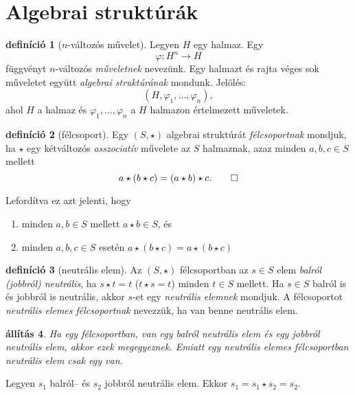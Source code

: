 \documentclass[9pt, a4paper, showtrims]{memoir}
\makeatletter
\renewenvironment{proof}[1][\proofname]
    {\par\pushQED{\qed}%
    \normalfont \topsep6\p@\@plus6\p@\relax
    \trivlist
    \item[\hskip\labelsep
        \itshape
    #1\@addpunct{:}]\ignorespaces}
    {\popQED\endtrivlist\@endpefalse}
\theoremstyle{plain}
\newtheorem{proposition}{állítás}[chapter]
\theoremstyle{remark}
\theoremstyle{definition}
\newtheorem{definition}[proposition]{definíció}
\makeatother
\begin{document}
\section{Algebrai struktúrák}
\begin{definition}[$n$-változós művelet]
    Legyen $H$ egy halmaz. Egy 
    \[
        \varphi\colon H^n\to H
    \]
    függvényt $n$-változós \emph{műveletnek} nevezünk.
    Egy halmazt és rajta véges sok műveletet együtt \emph{algebrai struktúrának} mondunk.
    Jelölés: 
    $$\left(H,\varphi_1,\dots,\varphi_n  \right),$$ 
    ahol $H$ a halmaz és
    $\varphi_1,\dots,\varphi_n$ a $H$ halmazon értelmezett műveletek.
\end{definition}
\begin{definition}[félcsoport]
    Egy $\left( S,\star \right)$ algebrai struktúrát \emph{félcsoportnak} mondjuk,
    ha $\star$ egy kétváltozós \emph{asszociatív}
    művelete az $S$ halmaznak,
    azaz minden $a,b,c\in S$ mellett
    \[
        a\star\left( b\star c \right)=\left( a\star b\right)\star c.\qedhere
    \]
\end{definition}
Lefordítva ez azt jelenti, hogy 
\begin{enumerate}
    \item minden $a,b\in S$ mellett $a\star b\in S$, és
    \item minden $a,b,c\in S$ esetén $a\star\left( b\star c \right)=a\star\left( b\star c \right)$
\end{enumerate}
\begin{definition}[neutrális elem]
    Az $\left( S,\star \right)$ félcsoportban az $s\in S$ elem \emph{balról (jobbról) neutrális},
    ha $s\star t=t$ ($t\star s=t$) minden $t\in S$ mellett.
    Ha $s\in S$ balról is és jobbról is neutrális, akkor $s$-et egy \emph{neutrális elemnek}
    mondjuk.
    A félcsoportot \emph{neutrális elemes félcsoportnak} nevezzük, ha van benne neutrális elem.
\end{definition}
\begin{proposition}
    Ha egy félcsoportban, van egy balról neutrális elem és egy jobbról neutrális elem, 
    akkor ezek megegyeznek. 
    Emiatt egy neutrális elemes félcsoportban neutrális elem csak egy van.
\end{proposition}
\begin{proof}
    Legyen $s_1$ balról-- és $s_2$ jobbról neutrális elem.
    Ekkor
    \(
    s_1=s_1\star s_2=s_2.
    \)
\end{proof}
\end{document}

